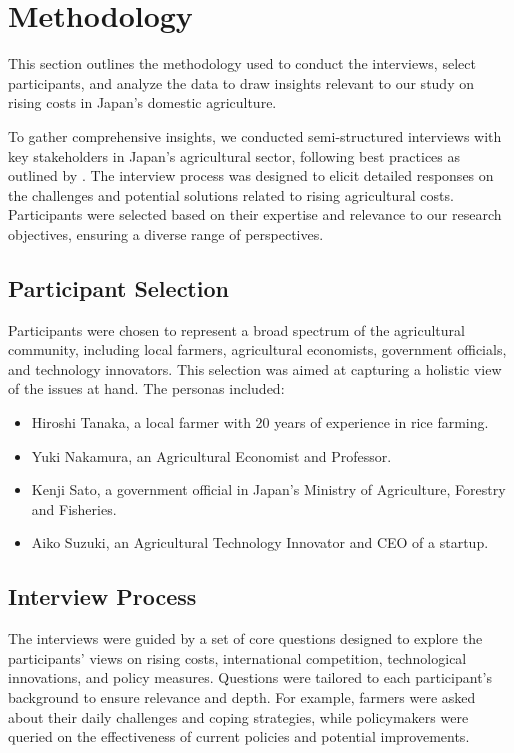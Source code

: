 \documentclass{article} %
\begin{document}
\section{Methodology}
\label{sec:method}

This section outlines the methodology used to conduct the interviews, select participants, and analyze the data to draw insights relevant to our study on rising costs in Japan's domestic agriculture.

To gather comprehensive insights, we conducted semi-structured interviews with key stakeholders in Japan's agricultural sector, following best practices as outlined by \citet{Bearman2019FocusOM}. The interview process was designed to elicit detailed responses on the challenges and potential solutions related to rising agricultural costs. Participants were selected based on their expertise and relevance to our research objectives, ensuring a diverse range of perspectives.

\subsection{Participant Selection}

Participants were chosen to represent a broad spectrum of the agricultural community, including local farmers, agricultural economists, government officials, and technology innovators. This selection was aimed at capturing a holistic view of the issues at hand. The personas included:
\begin{itemize}
    \item Hiroshi Tanaka, a local farmer with 20 years of experience in rice farming.
    \item Yuki Nakamura, an Agricultural Economist and Professor.
    \item Kenji Sato, a government official in Japan's Ministry of Agriculture, Forestry and Fisheries.
    \item Aiko Suzuki, an Agricultural Technology Innovator and CEO of a startup.
\end{itemize}

\subsection{Interview Process}

The interviews were guided by a set of core questions designed to explore the participants' views on rising costs, international competition, technological innovations, and policy measures. Questions were tailored to each participant's background to ensure relevance and depth. For example, farmers were asked about their daily challenges and coping strategies, while policymakers were queried on the effectiveness of current policies and potential improvements.
\end{document}
